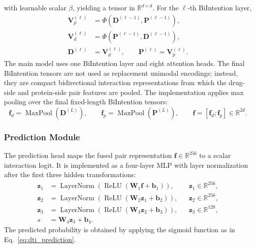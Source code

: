 with learnable scalar $\beta$, yielding a tensor in
$\mathbb{R}^{d\times d}$. For the $\ell$-th BiIntention layer,
\begin{equation}
\begin{aligned}
  \mathbf{V}_{p}^{(\ell)}
  &= \Phi(\mathbf{D}^{(\ell-1)},\mathbf{P}^{(\ell-1)}),\\
  \mathbf{V}_{d}^{(\ell)}
  &= \Phi(\mathbf{P}^{(\ell-1)},\mathbf{D}^{(\ell-1)}),\\
  \mathbf{D}^{(\ell)}
  &= \mathbf{V}_{d}^{(\ell)},\qquad
  \mathbf{P}^{(\ell)}
  = \mathbf{V}_{p}^{(\ell)}.
\end{aligned}
\label{eq:bidirectional_intention_update}
\end{equation}
The main model uses one BiIntention layer and eight attention heads. The final
BiIntention tensors are not used as replacement unimodal encodings; instead,
they are compact bidirectional interaction representations from which the
drug-side and protein-side pair features are pooled. The implementation applies
max pooling over the final fixed-length BiIntention tensors:
\begin{equation}
  \mathbf{f}_{d} =
  \operatorname{MaxPool}(\mathbf{D}^{(L)}),\qquad
  \mathbf{f}_{p} =
  \operatorname{MaxPool}(\mathbf{P}^{(L)}),\qquad
  \mathbf{f}=[\mathbf{f}_{d};\mathbf{f}_{p}]
  \in\mathbb{R}^{2d}.
  \label{eq:fusion_pooling}
\end{equation}

\subsubsection{Prediction Module}
\label{sec:prediction_module}

The prediction head maps the fused pair representation
$\mathbf{f}\in\mathbb{R}^{256}$ to a scalar interaction logit. It is implemented
as a four-layer MLP with layer normalization after the first three hidden
transformations:
\begin{equation}
\begin{aligned}
  \mathbf{z}_{1}
  &=
  \operatorname{LayerNorm}
  \left(
    \operatorname{ReLU}(\mathbf{W}_{1}\mathbf{f}+\mathbf{b}_{1})
  \right),
  &&
  \mathbf{z}_{1}\in\mathbb{R}^{256},\\
  \mathbf{z}_{2}
  &=
  \operatorname{LayerNorm}
  \left(
    \operatorname{ReLU}(\mathbf{W}_{2}\mathbf{z}_{1}+\mathbf{b}_{2})
  \right),
  &&
  \mathbf{z}_{2}\in\mathbb{R}^{256},\\
  \mathbf{z}_{3}
  &=
  \operatorname{LayerNorm}
  \left(
    \operatorname{ReLU}(\mathbf{W}_{3}\mathbf{z}_{2}+\mathbf{b}_{3})
  \right),
  &&
  \mathbf{z}_{3}\in\mathbb{R}^{128},\\
  s
  &=
  \mathbf{W}_{4}\mathbf{z}_{3}+\mathbf{b}_{4}.
\end{aligned}
\label{eq:prediction_mlp}
\end{equation}
The predicted probability is obtained by applying the sigmoid function as in
Eq.~\ref{eq:dti_prediction}.


